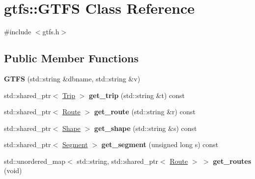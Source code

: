 \hypertarget{classgtfs_1_1GTFS}{}\section{gtfs\+:\+:G\+T\+FS Class Reference}
\label{classgtfs_1_1GTFS}


{\ttfamily \#include $<$gtfs.\+h$>$}

\subsection*{Public Member Functions}
\begin{DoxyCompactItemize}
\item 
\mbox{\label{classgtfs_1_1GTFS_abe065541610fe5d9673bc4befd0bcf94}} 
{\bfseries G\+T\+FS} (std\+::string \&dbname, std\+::string \&v)
\item 
\mbox{\label{classgtfs_1_1GTFS_aec86fae3dee1e13f541798266fb2317e}} 
std\+::shared\+\_\+ptr$<$ \hyperlink{classgtfs_1_1Trip}{Trip} $>$ {\bfseries get\+\_\+trip} (std\+::string \&t) const
\item 
\mbox{\label{classgtfs_1_1GTFS_a47cfbb8ca6cb8986e95f1038dcc7c04b}} 
std\+::shared\+\_\+ptr$<$ \hyperlink{classgtfs_1_1Route}{Route} $>$ {\bfseries get\+\_\+route} (std\+::string \&r) const
\item 
\mbox{\label{classgtfs_1_1GTFS_a59d1a7209999120b2446298f9fac4564}} 
std\+::shared\+\_\+ptr$<$ \hyperlink{classgtfs_1_1Shape}{Shape} $>$ {\bfseries get\+\_\+shape} (std\+::string \&s) const
\item 
\mbox{\label{classgtfs_1_1GTFS_afb9b3152a524f393c4414611dbeeba48}} 
std\+::shared\+\_\+ptr$<$ \hyperlink{classgtfs_1_1Segment}{Segment} $>$ {\bfseries get\+\_\+segment} (unsigned long s) const
\item 
\mbox{\label{classgtfs_1_1GTFS_aef6a88c15cdf8bf788e41c81a14ecc76}} 
std\+::unordered\+\_\+map$<$ std\+::string, std\+::shared\+\_\+ptr$<$ \hyperlink{classgtfs_1_1Route}{Route} $>$ $>$ {\bfseries get\+\_\+routes} (void)
\item 
\mbox{\label{classgtfs_1_1GTFS_ad526fc627fe1ce81b8a669f6187be0c0}} 

\end{DoxyCompactItemize}
